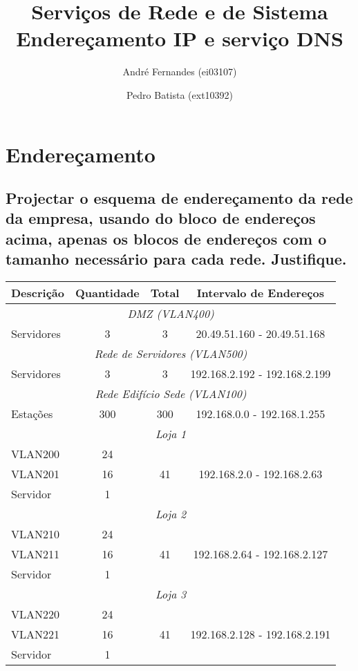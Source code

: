 \documentclass[a4paper,12pt]{article}
\title{Serviços de Rede e de Sistema \\
Endereçamento IP e serviço DNS}
\author{André Fernandes (ei03107) \and Pedro Batista (ext10392)}
\begin{document}
\maketitle

\section{Endereçamento}
\subsection{Projectar o esquema de endereçamento da rede da empresa,
usando do bloco de endereços acima, apenas os blocos de endereços com
o tamanho necessário para cada rede. Justifique.}

\begin{table}[h]
   \centering
   \begin{tabular}{ l | c | c | c }
      \toprule
      \textbf{Descrição} & \textbf{Quantidade} & \textbf{Total} & \textbf{Intervalo de Endereços} \\\hline

      \multicolumn{4}{c}{\textit{DMZ (VLAN400)}} \\\hline
      Servidores & 3 & 3 & 20.49.51.160 - 20.49.51.168 \\\hline

      \multicolumn{4}{c}{\textit{Rede de Servidores (VLAN500)}} \\\hline
      Servidores & 3 & 3 & 192.168.2.192 - 192.168.2.199 \\\hline

      \multicolumn{4}{c}{\textit{Rede Edifício Sede (VLAN100)}} \\ \hline
      Estações & 300 & 300 & 192.168.0.0 - 192.168.1.255 \\ \hline

      \multicolumn{4}{c}{\textit{Loja 1 }} \\\hline
      VLAN200 & 24 & \multirow{3}{*}{41} & \multirow{3}{*}{192.168.2.0 - 192.168.2.63} \\\cline{1-2}
      VLAN201 & 16 & \\\cline{1-2}
      Servidor & 1 & \\ \hline
      \multicolumn{4}{c}{\textit{Loja 2}} \\\hline
      VLAN210 & 24 & \multirow{3}{*}{41} & \multirow{3}{*}{192.168.2.64 - 192.168.2.127} \\\cline{1-2}
      VLAN211 & 16 & \\\cline{1-2}
      Servidor & 1 & \\ \hline
      \multicolumn{4}{c}{\textit{Loja 3}} \\\hline
      VLAN220 & 24 & \multirow{3}{*}{41} & \multirow{3}{*}{192.168.2.128 - 192.168.2.191} \\\cline{1-2}
      VLAN221 & 16 & \\\cline{1-2}
      Servidor & 1 & \\ \hline


\end{tabular}
\end{table}
\end{document}
